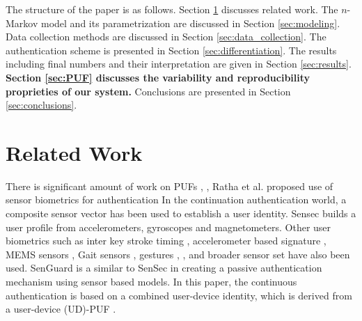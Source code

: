 \documentclass{acm_proc_article-sp}
\begin{document}
The structure of the paper is as follows. Section \ref{sec:related_work} discusses related work. The $n$-Markov model and its parametrization are discussed in Section \ref{sec:modeling}. 
Data collection methods are discussed in Section \ref{sec:data_collection}. The authentication scheme is presented in Section \ref{sec:differentiation}. The results including final numbers and 
their interpretation are given in Section \ref{sec:results}.
\textbf{
Section \ref{sec:PUF} discusses the variability and reproducibility proprieties of our system.
}
Conclusions are presented in Section \ref{sec:conclusions}. 

\section{Related Work}
\label{sec:related_work}
There is significant amount of work on PUFs \cite{Devadas:2009:PUF}, \cite{PUFIntro}, \cite{Gassend:2002:SPR}
Ratha et al. \cite{Ratha:2001} proposed use of sensor biometrics for authentication
In the continuation authentication world, a composite sensor vector \cite{zhu2013sensec} has been used
to establish a user identity. Sensec builds a user profile from accelerometers, gyroscopes and magnetometers. Other user biometrics such as inter key stroke timing 
\cite{KeystrokeHASE14},  accelerometer based signature \cite{Liu:2009:UAP}, MEMS sensors
\cite{Aysu:2013:DFL}, Gait sensors \cite{Gait}, gestures \cite{touchscreengestures}, \cite{Gesture14}, and 
broader sensor set \cite{Dey:2013:AHP} have also been
used. SenGuard \cite{shi2011senguard} is a similar to SenSec in creating a passive
authentication mechanism using sensor based models. In this paper, the continuous authentication is based on a combined user-device identity,
which is derived from a user-device (UD)-PUF \cite{ScheelTyagi15}.






\end{document}

